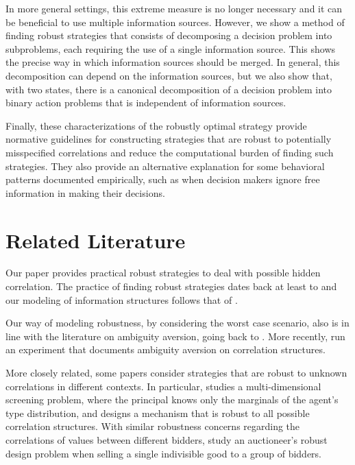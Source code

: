 \documentclass[11pt]{article}
\theoremstyle{plain}
\theoremstyle{remark}
\begin{document}
In more general settings, this extreme measure is no longer necessary and it can be beneficial to use multiple information sources. However, we show a method of finding robust strategies that consists of decomposing a decision problem into subproblems, each requiring the use of a single information source. This shows the precise way in which information sources should be merged. In general, this decomposition can depend on the information sources, but we also show that, with two states, there is a canonical decomposition of a decision problem into binary action problems that is independent of information sources.

Finally, these characterizations of the robustly optimal strategy provide normative guidelines for constructing strategies that are robust to potentially misspecified correlations and reduce the computational burden of finding such strategies. They also provide an alternative explanation for some behavioral patterns documented empirically, such as when decision makers ignore free information in making their decisions.






\section{Related Literature}
Our paper provides practical robust strategies to deal with possible hidden correlation. The practice  of finding robust strategies dates back at least to \citet{wald1950statistical}  and our modeling of information structures follows that of \citet{blackwell1953equivalent}. 

Our way of modeling robustness, by considering the worst case scenario, also is in line with the literature on ambiguity aversion, going back to \citet{gilboa1989maxmin}. More recently, \citet{epstein2019ambiguous} run an experiment that documents ambiguity aversion on correlation structures.

More closely related, some papers consider strategies that are robust to unknown correlations in different contexts. In particular, \citet{carroll2017robustness} studies a multi-dimensional screening problem, where the principal knows only the marginals of the agent's type distribution, and designs a mechanism that is robust to all possible correlation structures. With  similar robustness concerns regarding the correlations of values between different bidders, \citet{HeLi2020} study an auctioneer's robust design problem when selling a single indivisible good to a group of bidders.  
\end{document}
